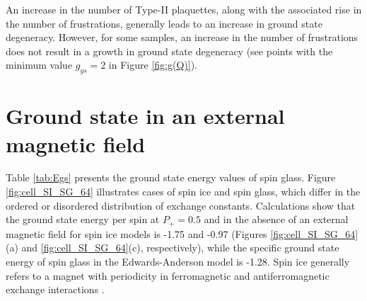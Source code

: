 \documentclass[utf8, babel, sor, jor, amsmath, amssymb, reprint]{elsarticle} %
\begin{document}
An increase in the number of Type-II plaquettes, along with the associated rise in the number of frustrations, generally leads to an increase in ground state degeneracy. However, for some samples, an increase in the number of frustrations does not result in a growth in ground state degeneracy (see points with the minimum value $g_{gs}=2$ in Figure \ref{fig:g(Q)}). 

\section{Ground state in an external magnetic field}

Table \ref{tab:Egs} presents the ground state energy values of spin glass. Figure \ref{fig:cell_SI_SG_64} illustrates cases of spin ice and spin glass, which differ in the ordered or disordered distribution of exchange constants. Calculations show that the ground state energy per spin at $P_+ = 0.5$ and in the absence of an external magnetic field for spin ice models is -1.75 and -0.97 (Figures \ref{fig:cell_SI_SG_64}(a) and \ref{fig:cell_SI_SG_64}(c), respectively), while the specific ground state energy of spin glass in the Edwards-Anderson model is -1.28. Spin ice generally refers to a magnet with periodicity in ferromagnetic and antiferromagnetic exchange interactions \cite{peretyatko2017interplay, otsuka2018husimi, andriushchenko2019large, shevchenko2017effect, kato2022flux}. 
\end{document}
